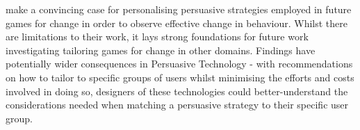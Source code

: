 \documentclass[11pt]{article}
\begin{document}
\citet{orji2017} make a convincing case for personalising persuasive strategies employed in future games for change in order to observe effective change in behaviour. Whilst there are limitations to their work, it lays strong foundations for future work investigating tailoring games for change in other domains. Findings have potentially wider consequences in Persuasive Technology - with recommendations on how to tailor to specific groups of users whilst minimising the efforts and costs involved in doing so, designers of these technologies could better-understand the considerations needed when matching a persuasive strategy to their specific user group.


\newpage
\small

\normalsize
\end{document}

